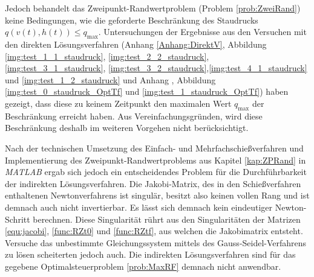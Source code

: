 Jedoch behandelt das Zweipunkt-Randwertproblem (Problem \ref{prob:ZweiRand}) keine Bedingungen, wie die geforderte Beschränkung des Staudrucks $q(v(t),h(t)) \leq q_{\max}$. Untersuchungen der Ergebnisse aus den Versuchen mit den direkten Lösungsverfahren (Anhang \ref{Anhang:DirektV}, Abbildung \ref{img:test_1_1_staudruck}, \ref{img:test_2_2_staudruck}, \ref{img:test_3_1_staudruck}, \ref{img:test_3_2_staudruck},\ref{img:test_4_1_staudruck} und \ref{img:test_1_2_staudruck} und Anhang \label{kap:OptTf}, Abbildung \ref{img:test_0_staudruck_OptTf} und \ref{img:test_1_staudruck_OptTf}) haben gezeigt, dass diese zu keinem Zeitpunkt den maximalen Wert $q_{\max}$ der Beschränkung erreicht haben. Aus Vereinfachungsgründen, wird diese Beschränkung deshalb im weiteren Vorgehen nicht berücksichtigt.

Nach der technischen Umsetzung des Einfach- und Mehrfachschießverfahren und Implementierung des Zweipunkt-Randwertproblems aus Kapitel \ref{kap:ZPRand} in \textit{MATLAB} ergab sich jedoch ein entscheidendes Problem für die Durchführbarkeit der indirekten Lösungsverfahren. Die Jakobi-Matrix, des in den Schießverfahren enthaltenen Newtonverfahrens ist singulär, besitzt also keinen vollen Rang und ist demnach auch nicht invertierbar. Es lässt sich demnach kein eindeutiger Newton-Schritt berechnen. Diese Singularität rührt aus den Singularitäten der Matrizen \ref{equ:jacobi}, \ref{func:RZt0} und \ref{func:RZtf}, aus welchen die Jakobimatrix entsteht. Versuche das unbestimmte Gleichungssystem mittels des Gauss-Seidel-Verfahrens zu lösen scheiterten jedoch auch. Die indirekten Lösungsverfahren sind für das gegebene Optimalsteuerproblem \ref{prob:MaxRF} demnach nicht anwendbar.